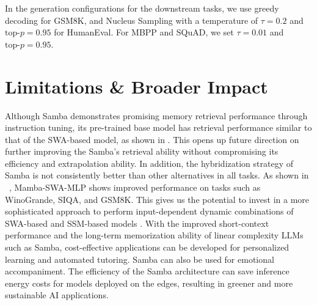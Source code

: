\documentclass{article}
\begin{document}
In the generation configurations for the downstream tasks, we use greedy decoding for GSM8K, and Nucleus Sampling \citep{holtzman2019curious} with a temperature of $\tau = 0.2$ and $\text{top-}p = 0.95$ for HumanEval. For MBPP and SQuAD, we set $\tau = 0.01$ and $\text{top-}p = 0.95$.

\section{Limitations \& Broader Impact}
Although Samba demonstrates promising memory retrieval performance through instruction tuning, its pre-trained base model has retrieval performance similar to that of the SWA-based model, as shown in . This opens up future direction on further improving the Samba's retrieval ability without compromising its efficiency and extrapolation ability. In addition, the hybridization strategy of Samba is not consistently better than other alternatives in all tasks. As shown in ~, Mamba-SWA-MLP shows improved performance on tasks such as WinoGrande, SIQA, and GSM8K. This gives us the potential to invest in a more sophisticated approach to perform input-dependent dynamic combinations of SWA-based and SSM-based models \citep{ren2023sparse}.  With the improved short-context performance and the long-term memorization ability of linear complexity LLMs such as Samba, cost-effective applications can be developed for personalized learning and automated tutoring. Samba can also be used for emotional accompaniment. The efficiency of the Samba architecture can save inference energy costs for models deployed on the edges, resulting in greener and more sustainable AI applications.







% 
\end{document}
